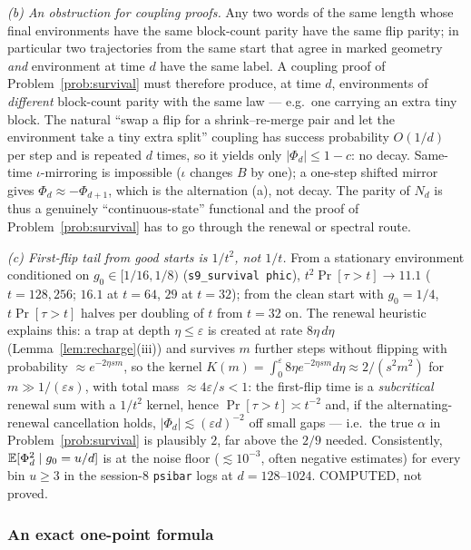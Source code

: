 \emph{(b) An obstruction for coupling proofs.}  Any two words of the
same length whose final environments have the same block-count parity
have the same flip parity; in particular two trajectories from the
same start that agree in marked geometry \emph{and} environment at
time $d$ have the same label.  A coupling proof of
Problem~\ref{prob:survival} must therefore produce, at time $d$,
environments of \emph{different} block-count parity with the same
law --- e.g.\ one carrying an extra tiny block.  The natural ``swap a
flip for a shrink--re-merge pair and let the environment take a tiny
extra split'' coupling has success probability $O(1/d)$ per step
and is repeated $d$ times, so it yields only $|\Phi_d|\le1-c$: no
decay.  Same-time $\iota$-mirroring is impossible ($\iota$ changes
$B$ by one); a one-step shifted mirror gives $\Phi_d\approx-\Phi_{d+1}$,
which is the alternation (a), not decay.  The parity of $N_d$ is thus
a genuinely ``continuous-state'' functional and the proof of
Problem~\ref{prob:survival} has to go through the renewal or spectral
route.

\emph{(c) First-flip tail from good starts is $1/t^2$, not $1/t$.}
From a stationary environment conditioned on $g_0\in[1/16,1/8)$
(\texttt{s9\_survival phic}), $t^2\Pr[\tau>t]\to11.1$ ($t=128,256$;
$16.1$ at $t=64$, $29$ at $t=32$); from the clean start with
$g_0=1/4$, $t\Pr[\tau>t]$ halves per doubling of $t$ from $t=32$ on.
The renewal heuristic explains this: a trap at depth $\eta\le\varepsilon$
is created at rate $8\eta\,d\eta$ (Lemma~\ref{lem:recharge}(iii)) and
survives $m$ further steps without flipping with probability
$\approx e^{-2\eta sm}$, so the kernel $K(m)=\int_0^\varepsilon
8\eta e^{-2\eta sm}d\eta\approx2/(s^2m^2)$ for $m\gg1/(\varepsilon s)$,
with total mass $\approx4\varepsilon/s<1$: the first-flip time is a
\emph{subcritical} renewal sum with a $1/t^2$ kernel, hence
$\Pr[\tau>t]\asymp t^{-2}$ and, if the alternating-renewal
cancellation holds, $|\Phi_d|\lesssim(\varepsilon d)^{-2}$ off small
gaps --- i.e.\ the true $\alpha$ in Problem~\ref{prob:survival} is
plausibly $2$, far above the $2/9$ needed.  Consistently,
$\mathbb{E}[\Phi_d^2\mid g_0=u/d]$ is at the noise floor ($\lesssim10^{-3}$,
often negative estimates) for every bin $u\ge3$ in the session-8
\texttt{psibar} logs at $d=128$--$1024$.  COMPUTED, not proved.

\subsubsection{An exact one-point formula}\label{sec:exactonept}

